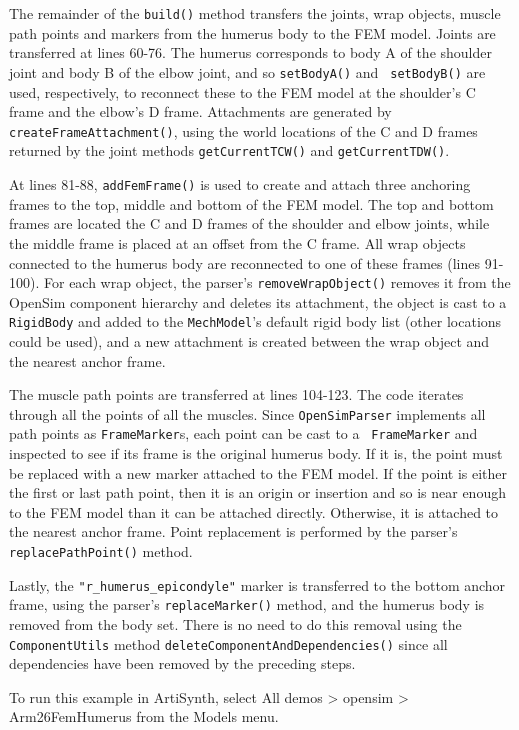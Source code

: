 The remainder of the {\tt build()} method transfers the joints, wrap objects,
muscle path points and markers from the humerus body to the FEM model.  Joints
are transferred at lines 60-76. The humerus corresponds to body A of the
shoulder joint and body B of the elbow joint, and so {\tt setBodyA()} and {\tt
setBodyB()} are used, respectively, to reconnect these to the FEM model at the
shoulder's C frame and the elbow's D frame.  Attachments are generated by {\tt
createFrameAttachment()}, using the world locations of the C and D frames
returned by the joint methods {\tt getCurrentTCW()} and {\tt getCurrentTDW()}.

At lines 81-88, {\tt addFemFrame()} is used to create and attach three
anchoring frames to the top, middle and bottom of the FEM model. The top and
bottom frames are located the C and D frames of the shoulder and elbow joints,
while the middle frame is placed at an offset from the C frame. All wrap
objects connected to the humerus body are reconnected to one of these frames
(lines 91-100). For each wrap object, the parser's {\tt removeWrapObject()}
removes it from the OpenSim component hierarchy and deletes its attachment, the
object is cast to a {\tt RigidBody} and added to the {\tt MechModel}'s default
rigid body list (other locations could be used), and a new attachment is
created between the wrap object and the nearest anchor frame.

The muscle path points are transferred at lines 104-123. The code iterates
through all the points of all the muscles. Since {\tt OpenSimParser} implements
all path points as {\tt FrameMarker}s, each point can be cast to a {\tt
FrameMarker} and inspected to see if its frame is the original humerus body. If
it is, the point must be replaced with a new marker attached to the FEM model.
If the point is either the first or last path point, then it is an origin or
insertion and so is near enough to the FEM model than it can be attached
directly. Otherwise, it is attached to the nearest anchor frame. Point
replacement is performed by the parser's {\tt replacePathPoint()} method.

Lastly, the {\tt "r\_humerus\_epicondyle"} marker is transferred to the bottom
anchor frame, using the parser's {\tt replaceMarker()} method, and the humerus
body is removed from the body set. There is no need to do this removal using
the {\tt ComponentUtils} method {\tt deleteComponentAndDependencies()} since
all dependencies have been removed by the preceding steps.

To run this example in ArtiSynth, select {\sf All demos > opensim >
Arm26FemHumerus} from the {\sf Models} menu.

\ifdefined\maindoc
\else

\fi
